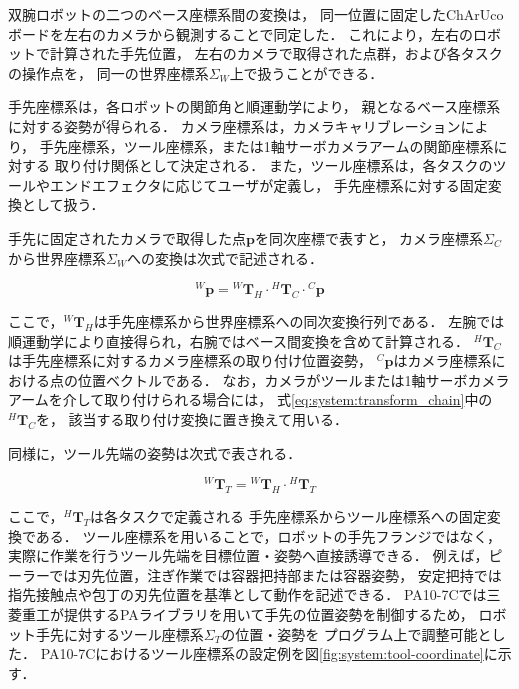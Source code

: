 双腕ロボットの二つのベース座標系間の変換は，
同一位置に固定したChArUcoボードを左右のカメラから観測することで同定した．
これにより，左右のロボットで計算された手先位置，
左右のカメラで取得された点群，および各タスクの操作点を，
同一の世界座標系$\Sigma_W$上で扱うことができる．

手先座標系は，各ロボットの関節角と順運動学により，
親となるベース座標系に対する姿勢が得られる．
カメラ座標系は，カメラキャリブレーションにより，
手先座標系，ツール座標系，または1軸サーボカメラアームの関節座標系に対する
取り付け関係として決定される．
また，ツール座標系は，各タスクのツールやエンドエフェクタに応じてユーザが定義し，
手先座標系に対する固定変換として扱う．

手先に固定されたカメラで取得した点$\bm{p}$を同次座標で表すと，
カメラ座標系$\Sigma_C$から世界座標系$\Sigma_W$への変換は次式で記述される．

\begin{equation}
  {}^{W}\bm{p}
  =
  {}^{W}\bm{T}_{H}
  \cdot
  {}^{H}\bm{T}_{C}
  \cdot
  {}^{C}\bm{p}
  \label{eq:system:transform_chain}
\end{equation}

ここで，${}^{W}\bm{T}_{H}$は手先座標系から世界座標系への同次変換行列である．
左腕では順運動学により直接得られ，右腕ではベース間変換を含めて計算される．
${}^{H}\bm{T}_{C}$は手先座標系に対するカメラ座標系の取り付け位置姿勢，
${}^{C}\bm{p}$はカメラ座標系における点の位置ベクトルである．
なお，カメラがツールまたは1軸サーボカメラアームを介して取り付けられる場合には，
式\eqref{eq:system:transform_chain}中の${}^{H}\bm{T}_{C}$を，
該当する取り付け変換に置き換えて用いる．

同様に，ツール先端の姿勢は次式で表される．

\begin{equation}
  {}^{W}\bm{T}_{T}
  =
  {}^{W}\bm{T}_{H}
  \cdot
  {}^{H}\bm{T}_{T}
  \label{eq:system:tool_transform}
\end{equation}

ここで，${}^{H}\bm{T}_{T}$は各タスクで定義される
手先座標系からツール座標系への固定変換である．
ツール座標系を用いることで，ロボットの手先フランジではなく，
実際に作業を行うツール先端を目標位置・姿勢へ直接誘導できる．
例えば，ピーラーでは刃先位置，注ぎ作業では容器把持部または容器姿勢，
安定把持では指先接触点や包丁の刃先位置を基準として動作を記述できる．
PA10-7Cでは三菱重工が提供するPAライブラリを用いて手先の位置姿勢を制御するため，
ロボット手先に対するツール座標系$\Sigma_T$の位置・姿勢を
プログラム上で調整可能とした．
PA10-7Cにおけるツール座標系の設定例を図\ref{fig:system:tool-coordinate}に示す．

